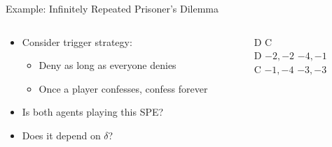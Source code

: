 \documentclass[11pt,aspectratio=169,handout]{beamer}
\begin{document}
  \begin{frame}{Example: Infinitely Repeated Prisoner's Dilemma} 
   \begin{columns}
    \begin{column}{0.7\textwidth}
     \begin{itemize}[<+->]
     \setlength{\itemsep}{1.2em}
      \item Consider \alert{trigger} strategy:
      \begin{itemize}[<.->]
       \item Deny as long as everyone denies
       \item Once a player confesses, confess \alert{forever}
      \end{itemize}
      \item Is both agents playing this SPE?
      \item Does it depend on $\delta$?
     \end{itemize}
    \end{column}
    \begin{column}{0.3\textwidth}
     \begin{center}
      \begin{game}{2}{2}
      		\> D			\> C			\\
       D		\> $-2,-2$	\> $-4,-1$	\\
       C		\> $-1,-4$	\> $-3,-3$
      \end{game}
     \end{center}
    \end{column}
   \end{columns}
  \end{frame}
  
\end{document}
